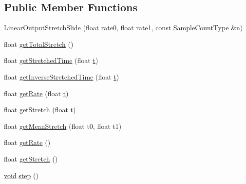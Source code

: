 \subsection*{Public Member Functions}
\begin{DoxyCompactItemize}
\item 
\hyperlink{class__sbsms___1_1_linear_output_stretch_slide_a3dfbf4fe292fb476b1ee6762b06108d3}{Linear\+Output\+Stretch\+Slide} (float \hyperlink{class__sbsms___1_1_linear_output_stretch_slide_af6573616ea89a1ee7bb35cb21e3b8a98}{rate0}, float \hyperlink{class__sbsms___1_1_linear_output_stretch_slide_ad8c0f2f2b8ee323a14e4b768a033362c}{rate1}, \hyperlink{getopt1_8c_a2c212835823e3c54a8ab6d95c652660e}{const} \hyperlink{namespace__sbsms___ae4ba47977e7e07f5945e529e2256b662}{Sample\+Count\+Type} \&n)
\item 
float \hyperlink{class__sbsms___1_1_linear_output_stretch_slide_a88cc9a6ced8a3d2fde83c86699618fe0}{get\+Total\+Stretch} ()
\item 
float \hyperlink{class__sbsms___1_1_linear_output_stretch_slide_adfd5b4c31d6fc05ef3c5681377ddf442}{get\+Stretched\+Time} (float \hyperlink{octave__test_8m_aaccc9105df5383111407fd5b41255e23}{t})
\item 
float \hyperlink{class__sbsms___1_1_linear_output_stretch_slide_a7615b322a51d533638545f850bfd3577}{get\+Inverse\+Stretched\+Time} (float \hyperlink{octave__test_8m_aaccc9105df5383111407fd5b41255e23}{t})
\item 
float \hyperlink{class__sbsms___1_1_linear_output_stretch_slide_a2ab0d996f059dd9fee798b79f23cac86}{get\+Rate} (float \hyperlink{octave__test_8m_aaccc9105df5383111407fd5b41255e23}{t})
\item 
float \hyperlink{class__sbsms___1_1_linear_output_stretch_slide_a7c3bb055d1f11d84c08bcdb5560285f1}{get\+Stretch} (float \hyperlink{octave__test_8m_aaccc9105df5383111407fd5b41255e23}{t})
\item 
float \hyperlink{class__sbsms___1_1_linear_output_stretch_slide_af4d5a78f58866e57d10e5616316afe27}{get\+Mean\+Stretch} (float t0, float t1)
\item 
float \hyperlink{class__sbsms___1_1_linear_output_stretch_slide_a6fed5068f83c948622610455d2d35975}{get\+Rate} ()
\item 
float \hyperlink{class__sbsms___1_1_linear_output_stretch_slide_aeb7a10b80f5f7e21cc1e06c146cbca41}{get\+Stretch} ()
\item 
\hyperlink{sound_8c_ae35f5844602719cf66324f4de2a658b3}{void} \hyperlink{class__sbsms___1_1_linear_output_stretch_slide_a1afc021edbafe909559f00898c501597}{step} ()
\end{DoxyCompactItemize}
